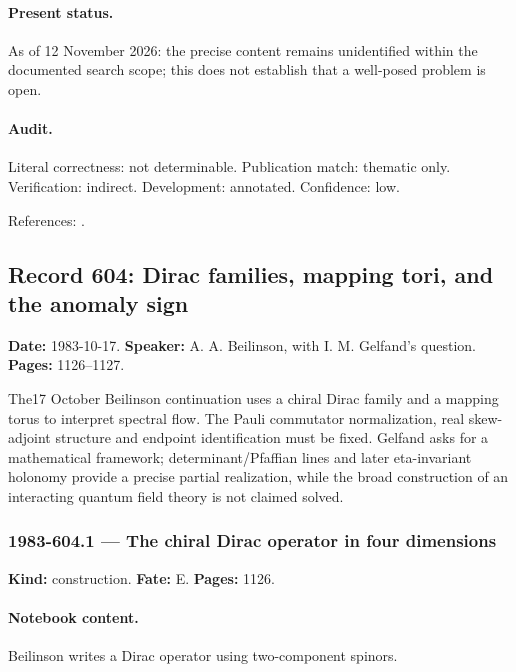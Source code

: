 \paragraph{Present status.} As of 12 November 2026: the precise content remains unidentified within the documented search scope; this does not establish that a well-posed problem is open.

\paragraph{Audit.} Literal correctness: not determinable. Publication match: thematic only. Verification: indirect. Development: annotated. Confidence: low.

\noindent References: \citep{daifreed1994eta}.\par

\subsection{Record 604: Dirac families, mapping tori, and the anomaly sign}

\label{talk:604}

\noindent\textbf{Date:} 1983-10-17. \textbf{Speaker:} A. A. Beilinson, with I. M. Gelfand's question. \textbf{Pages:} 1126--1127.\par

The17 October Beilinson continuation uses a chiral Dirac family and a mapping torus to interpret spectral flow. The Pauli commutator normalization, real skew-adjoint structure and endpoint identification must be fixed. Gelfand asks for a mathematical framework; determinant/Pfaffian lines and later eta-invariant holonomy provide a precise partial realization, while the broad construction of an interacting quantum field theory is not claimed solved.

\subsubsection{1983-604.1 --- The chiral Dirac operator in four dimensions}

\label{item:1983-604.1}

\noindent\textbf{Kind:} construction. \textbf{Fate:} E. \textbf{Pages:} 1126.\par

\paragraph{Notebook content.} Beilinson writes a Dirac operator using two-component spinors.

